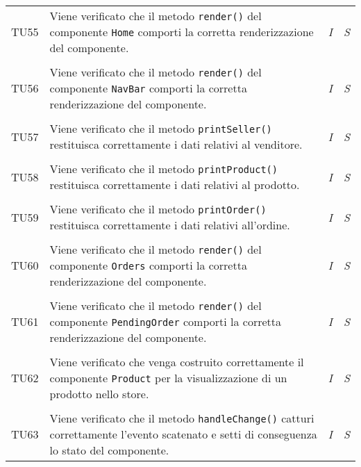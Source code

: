 \begin{longtable}{ >{\centering}p{} >{}p{}
				>{\centering}p{} >{\centering}p{}}
			\tabularnewline
			\hypertarget{TU55}{TU55} & Viene verificato che il metodo 
			\texttt{render()} del componente \texttt{Home} comporti la corretta 
			renderizzazione del componente. & 
			\textit{I} & 
			\textit{S}\\        
						     
			\tabularnewline
			\hypertarget{TU56}{TU56} & Viene verificato che il metodo 
			\texttt{render()} del componente \texttt{NavBar} comporti la corretta 
			renderizzazione del componente. & 
			\textit{I} & 
			\textit{S}\\        
						     
			\tabularnewline
			\hypertarget{TU57}{TU57} & Viene verificato che il metodo 
			\texttt{printSeller()} restituisca correttamente i dati relativi 
			al venditore. & 
			\textit{I} & 
			\textit{S}\\        
						     
			\tabularnewline
			\hypertarget{TU58}{TU58} & Viene verificato che il metodo 
			\texttt{printProduct()} restituisca correttamente i dati relativi 
			al prodotto. & 
			\textit{I} & 
			\textit{S}\\        
						     
			\tabularnewline
			\hypertarget{TU59}{TU59} & Viene verificato che il metodo 
			\texttt{printOrder()} restituisca correttamente i dati relativi 
			all'ordine. & 
			\textit{I} & 
			\textit{S}\\        
						     
			\tabularnewline
			\hypertarget{TU60}{TU60} & Viene verificato che il metodo 
			\texttt{render()} del componente \texttt{Orders} comporti la 
			corretta renderizzazione del componente. & 
			\textit{I} & 
			\textit{S}\\        
						     
			\tabularnewline
			\hypertarget{TU61}{TU61} & Viene verificato che il metodo 
			\texttt{render()} del componente \texttt{PendingOrder} comporti 
			la corretta renderizzazione del componente. & 
			\textit{I} & 
			\textit{S}\\        
						     
			\tabularnewline
			\hypertarget{TU62}{TU62} & Viene verificato che venga costruito 
			correttamente il componente \texttt{Product} per la visualizzazione 
			di un prodotto nello store. & 
			\textit{I} & 
			\textit{S}\\        
						     
			\tabularnewline
			\hypertarget{TU63}{TU63} & Viene verificato che il metodo 
			\texttt{handleChange()} catturi correttamente l'evento scatenato 
			e setti di conseguenza lo stato del componente. & 
			\textit{I} & 
			\textit{S}\\        
						     

\end{longtable}

